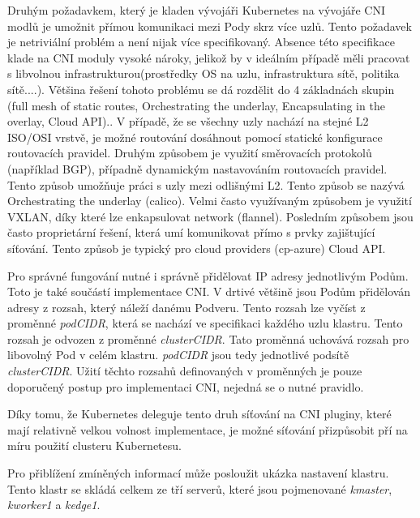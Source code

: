 Druhým požadavkem, který je kladen vývojáři Kubernetes na vývojáře CNI modlů je umožnit přímou komunikaci mezi Pody skrz více uzlů. Tento požadavek je netriviální problém a není nijak více specifikovaný. Absence této specifikace klade na CNI moduly vysoké nároky, jelikož by v ideálním případě měli pracovat s libvolnou infrastrukturou(prostředky OS na uzlu, infrastruktura sítě, politika sítě....). Většina řešení tohoto problému se dá rozdělit do 4 základnách skupin (full mesh of static routes, Orchestrating the underlay, Encapsulating in the overlay, Cloud API).\cite{kashin_2022_cni}\cite{cncfcloudnativecomputingfoundation_2019_kubernetes}. V případě, že se všechny uzly nachází na stejné L2 ISO/OSI vrstvě, je možné routování dosáhnout pomocí statické konfigurace routovacích pravidel. Druhým způsobem je využití směrovacích protokolů (například BGP), případně dynamickým nastavováním routovacích pravidel. Tento způsob umožňuje práci s uzly mezi odlišnými L2. Tento způsob se nazývá Orchestrating the underlay (calico). Velmi často využívaným způsobem je využití VXLAN, díky které lze enkapsulovat network (flannel). Posledním způsobem jsou často proprietární řešení, která umí komunikovat přímo s prvky zajištující síťování. Tento způsob je typický pro cloud providers (cp-azure) Cloud API.

Pro správné fungování nutné i správně přidělovat IP adresy jednotlivým Podům. Toto je také součástí implementace CNI. V drtivé většině jsou Podům přidělován adresy z rozsah, který náleží danému Podveru. Tento rozsah lze vyčíst z proměnné \textit{podCIDR}, která se nachází ve specifikaci každého uzlu klastru. Tento rozsah je odvozen z proměnné \textit{clusterCIDR}. Tato proměnná uchovává rozsah pro libovolný Pod v celém klastru. \textit{podCIDR} jsou tedy jednotlivé podsítě \textit{clusterCIDR}. Užití těchto rozsahů definovaných v proměnných je pouze doporučený postup pro implementaci CNI, nejedná se o nutné pravidlo.\cite{cncfcloudnativecomputingfoundation_2019_kubernetes}       

Díky tomu, že Kubernetes deleguje tento druh síťování na CNI pluginy, které mají relativně velkou volnost implementace, je možné síťování přizpůsobit pří na míru použití clusteru Kubernetesu.

Pro přiblížení zmíněných informací může posloužit ukázka nastavení klastru. Tento klastr se skládá celkem ze tří serverů, které jsou pojmenované \textit{kmaster}, \textit{kworker1} a \textit{kedge1}.
\cite{thekubernetesauthors_2023_kubectl}




